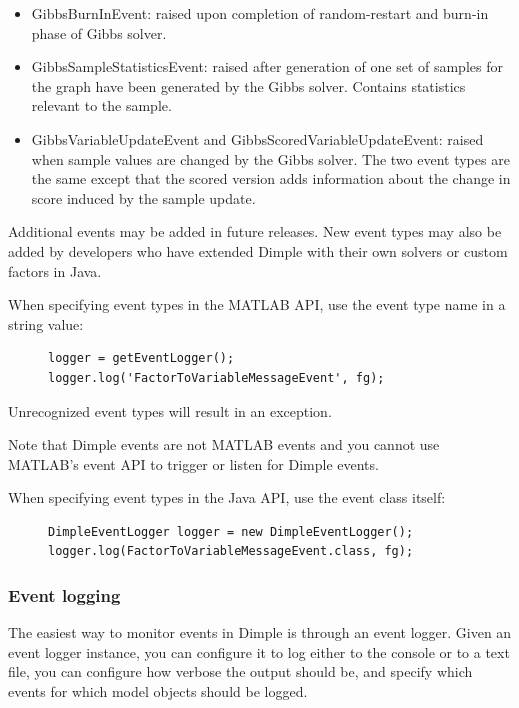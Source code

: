 \begin{itemize}
\begin{itemize}
  \item GibbsBurnInEvent: raised upon completion of random-restart and burn-in phase of Gibbs solver.
  \item GibbsSampleStatisticsEvent: raised after generation of one set of samples for the graph have been generated by the Gibbs solver. Contains statistics relevant to the sample.
  \item GibbsVariableUpdateEvent and GibbsScoredVariableUpdateEvent: raised when sample values are changed by the Gibbs solver. The two event types are the same except that the scored version adds information about the change in score induced by the sample update.
  \end{itemize}
\end{itemize}

Additional events may be added in future releases. New event types may also be added by developers who have extended Dimple with their own solvers or custom factors in Java.

\ifmatlab
When specifying event types in the MATLAB API, use the event type name in a string value:

\begin{figure}[H]
\begin{lstlisting}
logger = getEventLogger();
logger.log('FactorToVariableMessageEvent', fg);
\end{lstlisting}
\end{figure}

Unrecognized event types will result in an exception.

Note that Dimple events are not MATLAB events and you cannot use MATLAB's event API to trigger or listen for Dimple events.
\fi

\ifjava
When specifying event types in the Java API, use the event class itself:

\begin{figure}[H]
\begin{lstlisting}
DimpleEventLogger logger = new DimpleEventLogger();
logger.log(FactorToVariableMessageEvent.class, fg);
\end{lstlisting}
\end{figure}
\fi

\FloatBarrier

\subsubsection{Event logging}

The easiest way to monitor events in Dimple is through an event logger. Given an event logger instance, you can configure it to log either to the console or to a text file, you can configure how verbose the output should be, and specify which events for which model objects should be logged.

